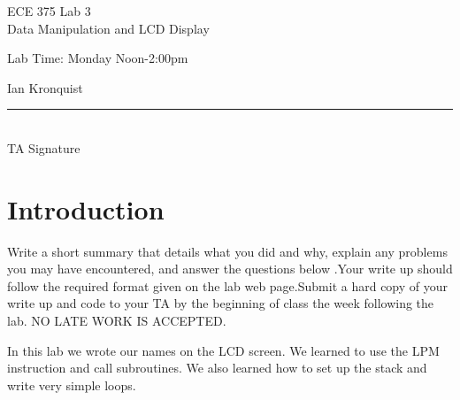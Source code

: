 \documentclass[12pt,letterpaper]{article}
\begin{document}
\begin{titlepage}
    \vspace*{4cm}
    \begin{flushright}
    {\huge
        ECE 375 Lab 3\\[1cm]
    }
    {\large
     Data Manipulation and LCD Display
    }
    \end{flushright}
    \begin{flushleft}
    Lab Time: Monday Noon-2:00pm
    \end{flushleft}
    \begin{flushright}
    Ian Kronquist
    \vfill
    \rule{5in}{.5mm}\\
    TA Signature
    \end{flushright}

\end{titlepage}

\section{Introduction}
Write a short summary that details what you did and why, explain any problems you may have encountered, and answer the questions below .Your write up should follow the required format given on the lab web page.Submit a hard copy of your write up and code to your TA by the beginning of class the week following the lab. NO LATE WORK IS ACCEPTED.

In this lab we wrote our names on the LCD screen. We learned to use the LPM instruction and call subroutines. We also learned how to set up the stack and write very simple loops.
\end{document}
